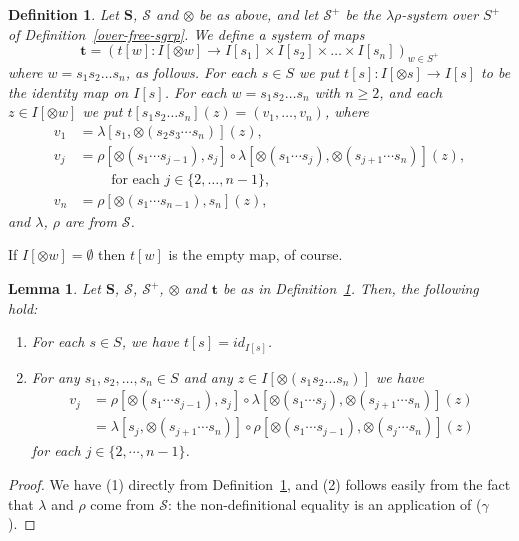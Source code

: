 \documentclass{amsart}
\newtheorem{lemma}{Lemma}
\newtheorem{definition}{Definition}
\begin{document}
\begin{definition}\label{free-t}
Let $\mathbf{S}$, $\mathcal{S}$ and $\otimes$ be as above, and let
$\mathcal{S}^+$ be the $\lambda\rho$-system over $S^+$ of
Definition~\ref{over-free-sgrp}. We define a system of maps 
$$
\mathbf{t} = (t[w]\colon I[\otimes w] \to
I[{s_1}]\times I[{s_2}]\times\dots\times I[{s_n}])_{w\in S^+}
$$
where $w = s_1s_2\dots s_n$, as follows. For each $s\in S$ we put
$t[s]\colon I[\otimes s]\to I[s]$ to be the identity map on $I[s]$.  
For each $w = s_1s_2\dots s_n$ with $n\geq 2$, and each $z\in I[\otimes w]$ we put
$t[s_1s_2\dots s_n](z) = (v_1,\dots, v_n)$, where
\begin{align*}
v_1 &= \lambda[s_1, \otimes(s_2s_3\cdots s_n)](z),\\
v_j &= \rho[\otimes(s_1\cdots s_{j-1}), s_j]\circ 
\lambda[\otimes(s_1\cdots s_j), \otimes(s_{j+1}\cdots s_n)](z),\\
&\qquad\text{ for each } j\in\{2,\dots,n-1\},\\  
v_n &= \rho[\otimes(s_1\cdots s_{n-1}), s_n](z),
\end{align*}
and $\lambda$, $\rho$ are from $\mathcal{S}$. 
\end{definition}

If $I[\otimes w] =\emptyset$ then
$t[w]$ is the empty map, of course.
  
\begin{lemma}\label{well-defd}
Let $\mathbf{S}$, $\mathcal{S}$, $\mathcal{S}^+$, $\otimes$ and\/
$\mathbf{t}$ be as in Definition~\ref{free-t}.   Then, the following hold:
\begin{enumerate}
\item For each $s\in S$, we have $t[s] = {id}_{I[s]}$.
\item For any $s_1,s_2,\dots, s_n \in S$ and any $z\in I[\otimes(s_1s_2\dots s_n)]$
we have
\begin{align*}
v_j &= \rho[\otimes(s_1\cdots s_{j-1}), s_j]\circ 
\lambda[\otimes(s_1\cdots s_j), \otimes(s_{j+1}\cdots s_n)](z)\\
&= \lambda[s_j, \otimes(s_{j+1}\cdots s_n)]\circ 
\rho[\otimes(s_1\cdots s_{j-1}),\otimes(s_{j}\cdots s_n)](z)
\end{align*}
for each $j\in \{2,\cdots,n-1\}$.
\end{enumerate}
\end{lemma}

\begin{proof}
We have (1) directly from Definition~\ref{free-t}, and  
(2) follows easily from the fact that $\lambda$ and $\rho$ come from
$\mathcal{S}$: the non-definitional equality is an application of ($\gamma$).  
\end{proof}
\end{document}
